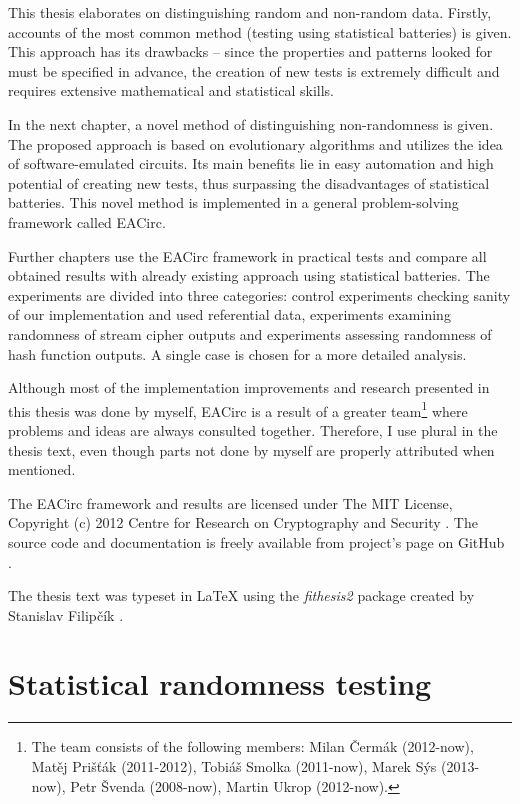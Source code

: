 \documentclass[12pt,oneside]{fithesis2}		%
\renewcommand{\_}{\leavevmode \kern0.0em\vbox{\hrule width0.4em}}
\begin{document}
This thesis elaborates on distinguishing random and non-random data. Firstly, accounts of the most common method (testing using
statistical batteries) is given. This approach has its drawbacks -- since the properties and patterns looked for must be specified
in advance, the creation of new tests is extremely difficult and requires extensive mathematical and statistical skills.

In the next chapter, a novel method of distinguishing non-randomness is given. The proposed approach is based on evolutionary
algorithms and utilizes the idea of software-emulated circuits. Its main benefits lie in easy automation and
high potential of creating new tests, thus surpassing the disadvantages of statistical batteries. 
This novel method is implemented in a general problem-solving framework called EACirc.

Further chapters use the EACirc framework in practical tests and compare all obtained results with already existing approach
using statistical batteries. The experiments are divided into three categories: control experiments checking sanity of our
implementation and used referential data, experiments examining randomness of stream cipher outputs and experiments
assessing randomness of hash function outputs. A single case is chosen for a more detailed analysis.

Although most of the implementation improvements and research presented in this thesis was done by myself, EACirc is
a result of a greater team\footnote{The team consists of the following members: Milan Čermák (2012-now), Matěj Prišťák (2011-2012),
Tobiáš Smolka (2011-now), Marek Sýs (2013-now), Petr Švenda (2008-now), Martin Ukrop (2012-now).}
where problems and ideas are always consulted together. Therefore, I use plural in the thesis text,
even though parts not done by myself are properly attributed when mentioned.

The EACirc framework and results are licensed under The MIT License, Copyright (c) 2012 Centre for Research 
on Cryptography and Security \parencite{crocs}. The source code and documentation is freely available from project's page on GitHub 
\parencite{eacirc-github}.

The thesis text was typeset in \LaTeX{} using the \textit{fithesis2} package created by Stanislav Filipčík \parencite{fithesis}.

\chapter{Statistical randomness testing}
\label{chap:stat-rand-testing}
\end{document}
